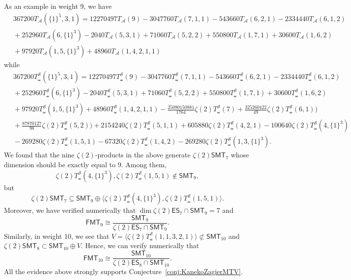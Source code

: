 \documentclass{article}
\newcommand{\FMTV}{\mathsf {FMT}}
\newcommand{\ES}{\mathsf {ES}}
\newcommand{\SMTV}{\mathsf {SMT}}
\newcommand{\sha}{\shuffle}
\newcommand{\Sy}{{\mathcal S}}
\newcommand{\calA}{\mathcal{A}}
\theoremstyle{plain}
\theoremstyle{definition}
\begin{document}
As an example in weight 9, we have
\begin{align*}
&\, 367200T_\calA(\{1\}^5, 3, 1)
=12270497T_\calA(9) - 3047760T_\calA(7, 1, 1) - 543660T_\calA(6, 2, 1) - 2334440T_\calA(6, 1, 2)\\
&\,+ 252960T_\calA(6, \{1\}^3) - 2040T_\calA(5, 3, 1) + 71060T_\calA(5, 2, 2) + 550800T_\calA(1, 7, 1) + 30600T_\calA(1, 6, 2) \\
&\,+ 97920T_\calA(1, 5,  \{1\}^3) + 48960T_\calA(1, 4, 2, 1, 1)
\end{align*}
while
\begin{align*}
&\,367200T_\sha^\Sy(\{1\}^5, 3, 1)
=12270497T_\sha^\Sy(9) - 3047760T_\sha^\Sy(7, 1, 1) - 543660T_\sha^\Sy(6, 2, 1) - 2334440T_\sha^\Sy(6, 1, 2)\\
&\,+ 252960T_\sha^\Sy(6, \{1\}^3) - 2040T_\sha^\Sy(5, 3, 1) + 71060T_\sha^\Sy(5, 2, 2) + 550800T_\sha^\Sy(1, 7, 1) + 30600T_\sha^\Sy(1, 6, 2) \\
&\,+ 97920T_\sha^\Sy(1, 5,  \{1\}^3) + 48960T_\sha^\Sy(1, 4, 2, 1, 1) -  \frac{25080150881}{1764 }\zeta(2)T_\sha^\Sy(7)+ \frac{325260422}{49}\zeta(2)T_\sha^\Sy(6, 1))\\
&\,+ \frac{87870127}{98}\zeta(2)T_\sha^\Sy(5, 2))+ 2154240\zeta(2)T_\sha^\Sy(5, 1, 1) + 605880\zeta(2)T_\sha^\Sy(4, 2, 1) - 100640\zeta(2)T_\sha^\Sy(4,  \{1\}^3) \\
&\,- 269280\zeta(2)T_\sha^\Sy(1, 5, 1) - 67320\zeta(2)T_\sha^\Sy(1, 4, 2) - 269280\zeta(2)T_\sha^\Sy(1, 3, \{1\}^3).
\end{align*}
We found that the nine $\zeta(2)$-products in the above generate $\zeta(2)\SMTV_7$ whose dimension should be exactly equal to 9. Among them,
\begin{equation*}
\zeta(2)T_\sha^\Sy(4,  \{1\}^3), \zeta(2)T_\sha^\Sy(1, 5, 1)\not\in \SMTV_9,
\end{equation*}
but
\begin{equation*}
\zeta(2)\SMTV_7\subseteq \SMTV_9\oplus \big\langle\zeta(2)T_\sha^\Sy(4,  \{1\}^3), \zeta(2)T_\sha^\Sy(1, 5, 1)  \big\rangle.
\end{equation*}
Moreover, we have verified numerically that $\dim \zeta(2)\ES_7\cap \SMTV_9=7$ and
\begin{equation*}
 \FMTV_9 \cong \frac{\SMTV_9}{\zeta(2)\ES_7\cap \SMTV_9}.
\end{equation*}
Similarly, in weight 10, we see that $V=\big\langle\zeta(2)T_\sha^\Sy(1, 1, 3, 2, 1)\big\rangle\not\subset \SMTV_{10}$ and  $\zeta(2)\SMTV_8\subset \SMTV_{10}\oplus V.$ Hence, we can verify numerically that
\begin{equation*}
 \FMTV_{10} \cong \frac{\SMTV_{10}}{\zeta(2)\ES_8\cap \SMTV_{10}}.
\end{equation*}
All the evidence above strongly supports Conjecture~\ref{conj:KanekoZagierMTV}.
\end{document}
